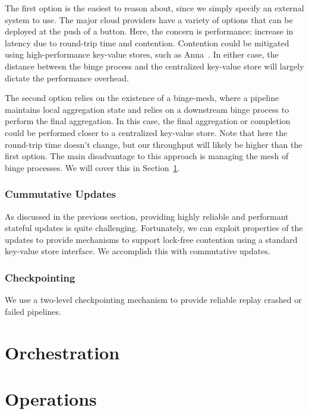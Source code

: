 \documentclass[10pt,twocolumn]{article}
\begin{document}
The first option is the easiest to reason about, since we simply specify an
external system to use.  The major cloud providers have a variety of options
that can be deployed at the push of a button.  Here, the concern is
performance: increase in latency due to round-trip time and contention.
Contention could be mitigated using high-performance key-value stores, such as
Anna~\cite{ANNA}.  In either case, the distance between the binge process and
the centralized key-value store will largely dictate the performance overhead.

The second option relies on the existence of a binge-mesh, where a pipeline
maintains local aggregation state and relies on a downstream binge process to
perform the final aggregation.  In this case, the final aggregation or
completion could be performed closer to a centralized key-value store.  Note
that here the round-trip time doesn't change, but our throughput will likely be
higher than the first option.  The main disadvantage to this approach is
managing the mesh of binge processes.  We will cover this in
Section~\ref{sec:orchestration}.

\subsubsection{Cummutative Updates}

As discussed in the previous section, providing highly reliable and performant
stateful updates is quite challenging.  Fortunately, we can exploit properties
of the updates to provide mechanisms to support lock-free contention using a
standard key-value store interface.  We accomplish this with commutative
updates.

\subsubsection{Checkpointing}

We use a two-level checkpointing mechanism to provide reliable replay crashed
or failed  pipelines.

\section{Orchestration}\label{sec:orchestration}

\section{Operations}\label{sec:operations}
\end{document}
